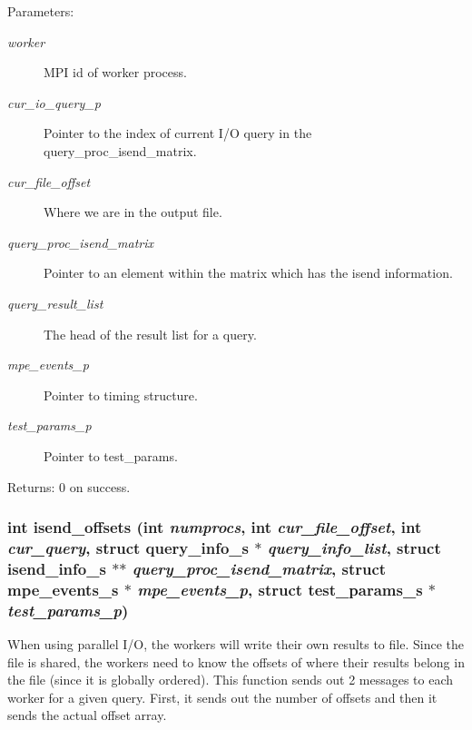 \begin{Desc}
\item[Parameters:]
\begin{description}
\item[{\em worker}]MPI id of worker process. \item[{\em cur\_\-io\_\-query\_\-p}]Pointer to the index of current I/O query in the query\_\-proc\_\-isend\_\-matrix. \item[{\em cur\_\-file\_\-offset}]Where we are in the output file. \item[{\em query\_\-proc\_\-isend\_\-matrix}]Pointer to an element within the matrix which has the isend information. \item[{\em query\_\-result\_\-list}]The head of the result list for a query. \item[{\em mpe\_\-events\_\-p}]Pointer to timing structure. \item[{\em test\_\-params\_\-p}]Pointer to test\_\-params. \end{description}
\end{Desc}
\begin{Desc}
\item[Returns:]0 on success. \end{Desc}
\subsubsection{\setlength{\rightskip}{0pt plus 5cm}int isend\_\-offsets (int {\em numprocs}, int {\em cur\_\-file\_\-offset}, int {\em cur\_\-query}, struct \bf{query\_\-info\_\-s} $\ast$ {\em query\_\-info\_\-list}, struct \bf{isend\_\-info\_\-s} $\ast$$\ast$ {\em query\_\-proc\_\-isend\_\-matrix}, struct \bf{mpe\_\-events\_\-s} $\ast$ {\em mpe\_\-events\_\-p}, struct \bf{test\_\-params\_\-s} $\ast$ {\em test\_\-params\_\-p})}\label{master__help_8c_8efbf4c27dad84d18e04ed04381b8b86}


When using parallel I/O, the workers will write their own results to file. Since the file is shared, the workers need to know the offsets of where their results belong in the file (since it is globally ordered). This function sends out 2 messages to each worker for a given query. First, it sends out the number of offsets and then it sends the actual offset array.

